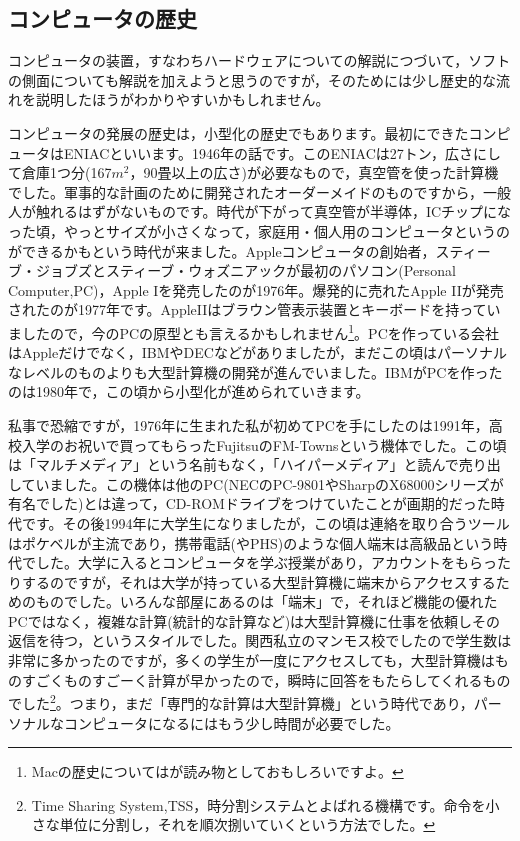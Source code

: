 \documentclass{ltjsbook}
\begin{document}
\subsection{コンピュータの歴史}
コンピュータの装置，すなわちハードウェアについての解説につづいて，ソフトの側面についても解説を加えようと思うのですが，そのためには少し歴史的な流れを説明したほうがわかりやすいかもしれません。

コンピュータの発展の歴史は，小型化の歴史でもあります。最初にできたコンピュータはENIACといいます。1946年の話です。このENIACは27トン，広さにして倉庫1つ分(167$m^2$，90畳以上の広さ)が必要なもので，真空管を使った計算機でした。軍事的な計画のために開発されたオーダーメイドのものですから，一般人が触れるはずがないものです。時代が下がって真空管が半導体，ICチップになった頃，やっとサイズが小さくなって，家庭用・個人用のコンピュータというのができるかもという時代が来ました。Appleコンピュータの創始者，スティーブ・ジョブズとスティーブ・ウォズニアックが最初のパソコン(Personal Computer,PC)，Apple Iを発売したのが1976年。爆発的に売れたApple IIが発売されたのが1977年です。AppleIIはブラウン管表示装置とキーボードを持っていましたので，今のPCの原型とも言えるかもしれません\footnote{Macの歴史については\textcite{Isaacson2012}が読み物としておもしろいですよ。}。PCを作っている会社はAppleだけでなく，IBMやDECなどがありましたが，まだこの頃はパーソナルなレベルのものよりも大型計算機の開発が進んでいました。IBMがPCを作ったのは1980年で，この頃から小型化が進められていきます。

私事で恐縮ですが，1976年に生まれた私が初めてPCを手にしたのは1991年，高校入学のお祝いで買ってもらったFujitsuのFM-Townsという機体でした。この頃は「マルチメディア」という名前もなく，「ハイパーメディア」と読んで売り出していました。この機体は他のPC(NECのPC-9801やSharpのX68000シリーズが有名でした)とは違って，CD-ROMドライブをつけていたことが画期的だった時代です。その後1994年に大学生になりましたが，この頃は連絡を取り合うツールはポケベルが主流であり，携帯電話(やPHS)のような個人端末は高級品という時代でした。大学に入るとコンピュータを学ぶ授業があり，アカウントをもらったりするのですが，それは大学が持っている大型計算機に端末からアクセスするためのものでした。いろんな部屋にあるのは「端末」で，それほど機能の優れたPCではなく，複雑な計算(統計的な計算など)は大型計算機に仕事を依頼しその返信を待つ，というスタイルでした。関西私立のマンモス校でしたので学生数は非常に多かったのですが，多くの学生が一度にアクセスしても，大型計算機はものすごくものすごーく計算が早かったので，瞬時に回答をもたらしてくれるものでした\footnote{Time Sharing System,TSS，時分割システムとよばれる機構です。命令を小さな単位に分割し，それを順次捌いていくという方法でした。}。つまり，まだ「専門的な計算は大型計算機」という時代であり，パーソナルなコンピュータになるにはもう少し時間が必要でした。
\end{document}

